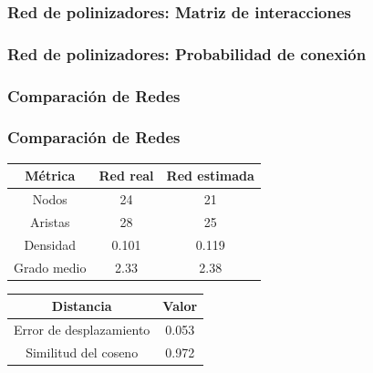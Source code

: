 \begin{frame}
    \frametitle{Red de polinizadores: Matriz de interacciones}
    \begin{center}
    \end{center}
\end{frame}    

\begin{frame}
    \frametitle{Red de polinizadores: Probabilidad de conexión}
    \begin{center}
    \end{center}
\end{frame}
    

\begin{frame}
    \frametitle{Comparación de Redes}
    \begin{center}
    \end{center}
\end{frame}

\begin{frame}
    \frametitle{Comparación de Redes}

    \begin{center}\small
        \begin{tabular}{@{}ccc@{}}
            \toprule
                  \textbf{Métrica} & \textbf{Red real}  &  \textbf{Red estimada}\\ 
            \midrule
                Nodos &  24 &  21 \\
                Aristas &  28 &  25 \\
                Densidad &  0.101 &  0.119 \\
                Grado medio & 2.33 & 2.38 \\
            \bottomrule
            \end{tabular}
    \end{center}

    \begin{center}\small
    \begin{tabular}{@{}cc@{}}
    \toprule
    \textbf{Distancia} & \textbf{Valor} \\
    \midrule
    Error de desplazamiento & 0.053 \\
    Similitud del coseno & 0.972 \\
    \bottomrule
    \end{tabular}
    \end{center}

\end{frame}

    